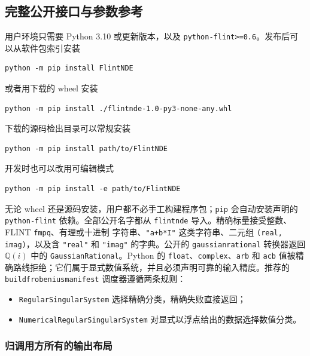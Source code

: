 \documentclass[11pt,a4paper]{ctexart}
\renewcommand{\_}{\origunderscore\allowbreak}
\begin{document}
\subsection{完整公开接口与参数参考}
\label{sec:user-interface}
\label{subsec:public-interface}

用户环境只需要 Python 3.10 或更新版本，以及 \texttt{python-flint>=0.6}。发布后可以从软件包索引安装
\begin{verbatim}
python -m pip install FlintNDE
\end{verbatim}
或者用下载的 wheel 安装
\begin{verbatim}
python -m pip install ./flintnde-1.0-py3-none-any.whl
\end{verbatim}
下载的源码检出目录可以常规安装
\begin{verbatim}
python -m pip install path/to/FlintNDE
\end{verbatim}
开发时也可以改用可编辑模式
\begin{verbatim}
python -m pip install -e path/to/FlintNDE
\end{verbatim}
无论 wheel 还是源码安装，用户都不必手工构建程序包；\texttt{pip} 会自动安装声明的 \texttt{python-flint}
依赖。全部公开名字都从 \texttt{flintnde} 导入。精确标量接受整数、FLINT \texttt{fmpq}、有理或十进制
字符串、\texttt{"a+b*I"} 这类字符串、二元组 \texttt{(real, imag)}，以及含 \texttt{"real"} 和
\texttt{"imag"} 的字典。公开的 \texttt{gaussian\_rational} 转换器返回 $\mathbb Q(i)$ 中的
\texttt{GaussianRational}。Python 的 \texttt{float}、\texttt{complex}、\texttt{arb} 和 \texttt{acb}
值被精确路线拒绝；它们属于显式数值系统，并且必须声明可靠的输入精度。推荐的
\texttt{build\_frobenius\_manifest} 调度器遵循两条规则：
\begin{itemize}
  \item \texttt{RegularSingularSystem} 选择精确分类，精确失败直接返回；
  \item \texttt{NumericalRegularSingularSystem} 对显式以浮点给出的数据选择数值分类。
\end{itemize}

\subsubsection{归调用方所有的输出布局}
\end{document}
